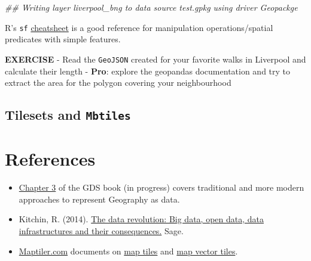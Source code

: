 \documentclass[
  letterpaper,
  DIV=11,
  numbers=noendperiod]{scrreprt}
\newenvironment{Shaded}{\begin{snugshade}}{\end{snugshade}}
\newcommand{\DocumentationTok}[1]{\textcolor[rgb]{0.37,0.37,0.37}{\textit{#1}}}
\begin{document}
\begin{Shaded}
\begin{Highlighting}[]
\DocumentationTok{\#\# Writing layer \textasciigrave{}liverpool\_bng\textquotesingle{} to data source \textasciigrave{}test.gpkg\textquotesingle{} using driver \textasciigrave{}Geopackge\textquotesingle{}}
\end{Highlighting}
\end{Shaded}

R's \texttt{sf}
\href{https://github.com/rstudio/cheatsheets/blob/main/sf.pdf}{cheatsheet}
is a good reference for manipulation operations/spatial predicates with
simple features.

\textbf{EXERCISE} - Read the \texttt{GeoJSON} created for your favorite
walks in Liverpool and calculate their length - \textbf{Pro}: explore
the geopandas documentation and try to extract the area for the polygon
covering your neighbourhood

\hypertarget{tilesets-and-mbtiles}{%
\subsection{\texorpdfstring{Tilesets and
\texttt{Mbtiles}}{Tilesets and Mbtiles}}\label{tilesets-and-mbtiles}}

\hypertarget{references-2}{%
\section{References}\label{references-2}}

\begin{itemize}
\item
  \href{https://geographicdata.science/book/notebooks/03_spatial_data.html}{Chapter
  3} of the GDS book (in progress) covers traditional and more modern
  approaches to represent Geography as data.
\item
  Kitchin, R. (2014).
  \href{https://www.perlego.com/book/860829/the-data-revolution-big-data-open-data-data-infrastructures-and-their-consequences-pdf?utm_source=google\&utm_medium=cpc\&campaignid=15781033413\&adgroupid=134828831187\&gclid=CjwKCAiAzp6eBhByEiwA_gGq5Otph9MDAPkgkT_yBOH3u8Z0rRiL8TLCr32xzW5pY_uIIjTV7r4S7RoCMXsQAvD_BwE}{The
  data revolution: Big data, open data, data infrastructures and their
  consequences.} Sage.
\item
  \href{https://www.maptiler.com/}{Maptiler.com} documents on
  \href{https://www.maptiler.com/google-maps-coordinates-tile-bounds-projection/\#3/15.00/50.00}{map
  tiles} and
  \href{https://www.maptiler.com/news/2019/02/what-are-vector-tiles-and-why-you-should-care/}{map
  vector tiles}.
\end{itemize}
\end{document}
